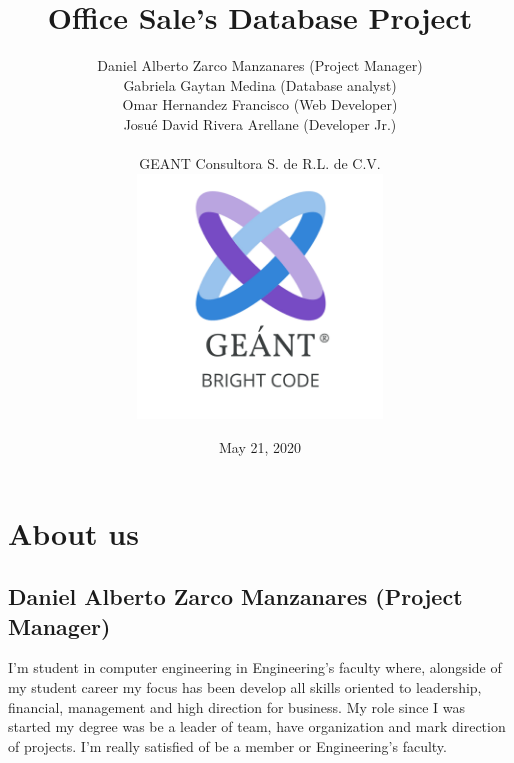 \documentclass{article}
\begin{document}
\title{Office Sale's Database Project}
\author{Daniel Alberto Zarco Manzanares (Project Manager)\\Gabriela Gaytan Medina (Database analyst)\\Omar Hernandez Francisco (Web Developer)\\ Josué David Rivera Arellane (Developer Jr.)\\\\GEANT Consultora S. de R.L. de C.V.\\ \includegraphics[width=6.5cm]{EmpresaAdminProyectos}}
\date{May 21, 2020}
\maketitle
\newpage
\section{About us}
\subsection{Daniel Alberto Zarco Manzanares (Project Manager)}
I'm student in computer engineering in Engineering's faculty where, alongside of my student career my focus has been develop all skills oriented to leadership, financial, management and high direction for business. My role since I was started my degree was be a leader of team, have organization and mark direction of projects. I'm really satisfied of be a member or Engineering's faculty.
\end{document}
